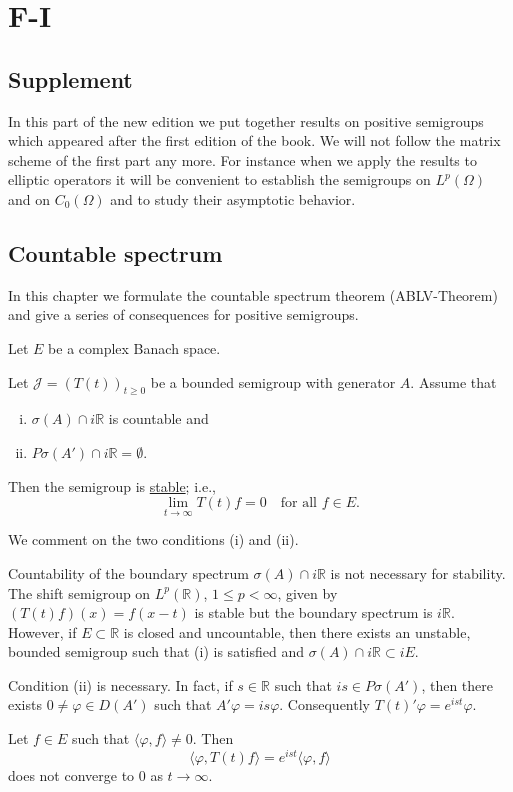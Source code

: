 \chapter{F-I}
\section{Supplement}

In this part of the new edition we put together results on positive semigroups which appeared after the first edition of the book. 
We will not follow the matrix scheme of the first part any more. 
For instance when we apply the results to elliptic operators it will be convenient to establish the semigroups on $L^{p}(\Omega)$ and on $C_{0}(\Omega)$ and to study their asymptotic behavior.

\section{Countable spectrum}

In this chapter we formulate the countable spectrum theorem (ABLV-Theorem) and give a series of consequences for positive semigroups.

Let $E$ be a complex Banach space.

\begin{theorem}
Let $\mathcal{J} = (T(t))_{t \geq 0}$ be a bounded semigroup with generator $A$. Assume that
\begin{enumerate}[(i)]
\item $\sigma(A) \cap i\mathbb{R}$ is countable and
\item $P\sigma(A') \cap i\mathbb{R} = \emptyset$.
\end{enumerate}

Then the semigroup is \underline{stable}; i.e.,
\begin{equation*}
\lim_{t \to \infty} T(t)f = 0 \quad \text{for all } f \in E.
\end{equation*}
\end{theorem}

We comment on the two conditions (i) and (ii).

Countability of the boundary spectrum $\sigma(A) \cap i\mathbb{R}$ is not necessary for stability. 
The shift semigroup on $L^p(\mathbb{R})$, $1 \leq p < \infty$, given by $(T(t)f)(x) = f(x-t)$ is stable but the boundary spectrum is $i\mathbb{R}$. 
However, if $E \subset \mathbb{R}$ is closed and uncountable, then there exists an unstable, bounded semigroup such that (i) is satisfied and $\sigma(A) \cap i\mathbb{R} \subset iE$.

Condition (ii) is necessary. In fact, if $s \in \mathbb{R}$ such that $is \in P\sigma(A')$, then there exists $0 \neq \varphi \in D(A')$ such that $A'\varphi = is\varphi$. Consequently $T(t)'\varphi = e^{ist}\varphi$.

Let $f \in E$ such that $\langle \varphi, f \rangle \neq 0$. Then 
\begin{equation*}
\langle \varphi, T(t)f \rangle = e^{ist} \langle \varphi, f \rangle
\end{equation*}
does not converge to $0$ as $t \to \infty$.
